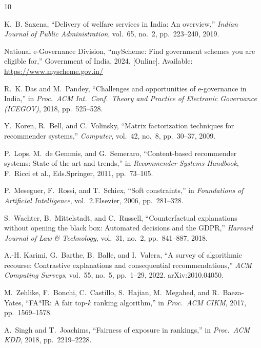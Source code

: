 \documentclass[conference]{IEEEtran}
\begin{document}
\begin{thebibliography}{10}

K.~B. Saxena, ``Delivery of welfare services in India: An overview,'' \textit{Indian Journal of Public Administration}, vol.~65, no.~2, pp.~223--240, 2019.

National e-Governance Division, ``myScheme: Find government schemes you are eligible for,'' Government of India, 2024. [Online]. Available: \url{https://www.myscheme.gov.in/}

R.~K. Das and M.~Pandey, ``Challenges and opportunities of e-governance in India,'' in \textit{Proc.\ ACM Int.\ Conf.\ Theory and Practice of Electronic Governance (ICEGOV)}, 2018, pp.~525--528.

Y.~Koren, R.~Bell, and C.~Volinsky, ``Matrix factorization techniques for recommender systems,'' \textit{Computer}, vol.~42, no.~8, pp.~30--37, 2009.

P.~Lops, M.~de Gemmis, and G.~Semeraro, ``Content-based recommender systems: State of the art and trends,'' in \textit{Recommender Systems Handbook}, F.~Ricci et al., Eds.\quad Springer, 2011, pp.~73--105.

P.~Meseguer, F.~Rossi, and T.~Schiex, ``Soft constraints,'' in \textit{Foundations of Artificial Intelligence}, vol.~2.\quad Elsevier, 2006, pp.~281--328.

S.~Wachter, B.~Mittelstadt, and C.~Russell, ``Counterfactual explanations without opening the black box: Automated decisions and the GDPR,'' \textit{Harvard Journal of Law \& Technology}, vol.~31, no.~2, pp.~841--887, 2018.

A.-H. Karimi, G.~Barthe, B.~Balle, and I.~Valera, ``A survey of algorithmic recourse: Contrastive explanations and consequential recommendations,'' \textit{ACM Computing Surveys}, vol.~55, no.~5, pp.~1--29, 2022. arXiv:2010.04050.

M.~Zehlike, F.~Bonchi, C.~Castillo, S.~Hajian, M.~Megahed, and R.~Baeza-Yates, ``FA*IR: A fair top-$k$ ranking algorithm,'' in \textit{Proc.\ ACM CIKM}, 2017, pp.~1569--1578.

A.~Singh and T.~Joachims, ``Fairness of exposure in rankings,'' in \textit{Proc.\ ACM KDD}, 2018, pp.~2219--2228.


\end{thebibliography}
\end{document}
